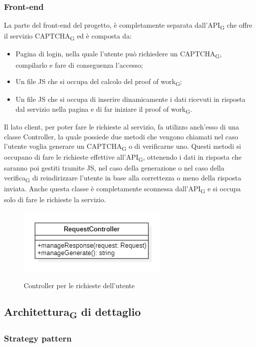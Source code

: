 \subsubsection{Front-end}
La parte del front-end del progetto, è completamente separata dall'API\textsubscript{G} che offre il servizio CAPTCHA\textsubscript{G} ed è composta da:
\begin{itemize}
	\item Pagina di login, nella quale l'utente può richiedere un CAPTCHA\textsubscript{G}, 
    compilarlo e fare di conseguenza l'accesso;
    \item Un file JS che si occupa del calcolo del proof of work\textsubscript{G};
    \item Un file JS che si occupa di inserire dinamicamente i dati ricevuti in risposta dal servizio nella pagina e di far iniziare il proof of work\textsubscript{G}.
\end{itemize}
Il lato client, per poter fare le richieste al servizio, fa utilizzo anch'esso di una classe Controller, la quale possiede due metodi che vengono chiamati nel caso l'utente voglia generare un CAPTCHA\textsubscript{G} o di verificarne uno. Questi metodi si occupano di fare le richieste effettive all'API\textsubscript{G}, ottenendo i dati in risposta che saranno poi gestiti tramite JS, nel caso della generazione o nel caso della verifica\textsubscript{G} di reindirizzare l'utente in base alla correttezza o meno della risposta inviata.
Anche questa classe è completamente sconnessa dall'API\textsubscript{G} e si occupa solo di fare le richieste la servizio. 

\begin{figure}[H]
	\centering
	\includegraphics[scale = 0.8]{img/request_controller.png}\\
	\caption{Controller per le richieste dell'utente}
\end{figure}

\subsection{Architettura\textsubscript{G} di dettaglio}

\subsubsection{Strategy pattern}

